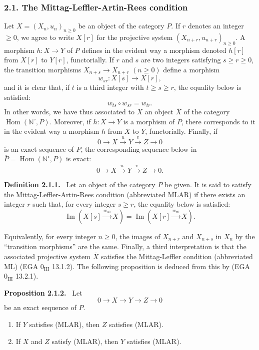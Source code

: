 \documentclass[11pt]{article}
\providecommand{\NN}{\mathbb{N}}
\newenvironment{statement}[1]{\par\medskip\noindent\textbf{#1.}\ }{\par\medskip}
\DeclareMathOperator{\Hom}{Hom}
\providecommand{\Hom}{\operatorname{Hom}}
\providecommand{\NN}{\mathbb N}
\providecommand{\Im}{\operatorname{Im}}
\renewcommand{\Im}{\operatorname{Im}}
\providecommand{\Im}{\operatorname{Im}}
\providecommand{\Hom}{\operatorname{Hom}}
\begin{document}
\subsubsection*{2.1. The Mittag-Leffler-Artin-Rees condition}
Let $X=(X_n,u_n)_{n\ge0}$ be an object of the category $P$. If $r$ denotes an integer $\ge0$, we agree to write $X[r]$ for the projective system $(X_{n+r},u_{n+r})_{n\ge0}$. A morphism $h:X\to Y$ of $P$ defines in the evident way a morphism denoted $h[r]$ from $X[r]$ to $Y[r]$, functorially. If $r$ and $s$ are two integers satisfying $s\ge r\ge0$, the transition morphisms $X_{n+s}\to X_{n+r}$ $(n\ge0)$ define a morphism
\[
w_{sr}:X[s]\longrightarrow X[r],
\]
and it is clear that, if $t$ is a third integer with $t\ge s\ge r$, the equality below is satisfied:
\[
w_{ts}\circ w_{sr}=w_{tr}.
\]
In other words, we have thus associated to $X$ an object $\overline X$ of the category $\Hom(\NN^\circ,P)$. Moreover, if $h:X\to Y$ is a morphism of $P$, there corresponds to it in the evident way a morphism $\overline h$ from $\overline X$ to $\overline Y$, functorially. Finally, if
\[
0\longrightarrow X\stackrel{u}{\longrightarrow}Y\stackrel{v}{\longrightarrow}Z\longrightarrow0
\]
is an exact sequence of $P$, the corresponding sequence below in $\overline P=\Hom(\NN^\circ,P)$ is exact:
\[
0\longrightarrow\overline X\stackrel{\overline u}{\longrightarrow}\overline Y\stackrel{\overline v}{\longrightarrow}\overline Z\longrightarrow0.
\]

\begin{statement}{Definition 2.1.1}
Let an object of the category $P$ be given. It is said to satisfy the Mittag-Leffler-Artin-Rees condition (abbreviated MLAR) if there exists an integer $r$ such that, for every integer $s\ge r$, the equality below is satisfied:
\[
\Im(X[s]\xrightarrow{w_{s0}}X)=\Im(X[r]\xrightarrow{w_{r0}}X).
\]
\end{statement}
Equivalently, for every integer $n\ge0$, the images of $X_{n+r}$ and $X_{n+s}$ in $X_n$ by the ``transition morphisms'' are the same. Finally, a third interpretation is that the associated projective system $\overline X$ satisfies the Mittag-Leffler condition (abbreviated ML) (EGA $0_{\mathrm{III}}$ 13.1.2). The following proposition is deduced from this by (EGA $0_{\mathrm{III}}$ 13.2.1).

\begin{statement}{Proposition 2.1.2}
Let
\[
0\longrightarrow X\longrightarrow Y\longrightarrow Z\longrightarrow0
\]
be an exact sequence of $P$.
\begin{enumerate}[label=(\roman*)]
\item If $Y$ satisfies (MLAR), then $Z$ satisfies (MLAR).
\item If $X$ and $Z$ satisfy (MLAR), then $Y$ satisfies (MLAR).
\end{enumerate}
\end{statement}
\end{document}
